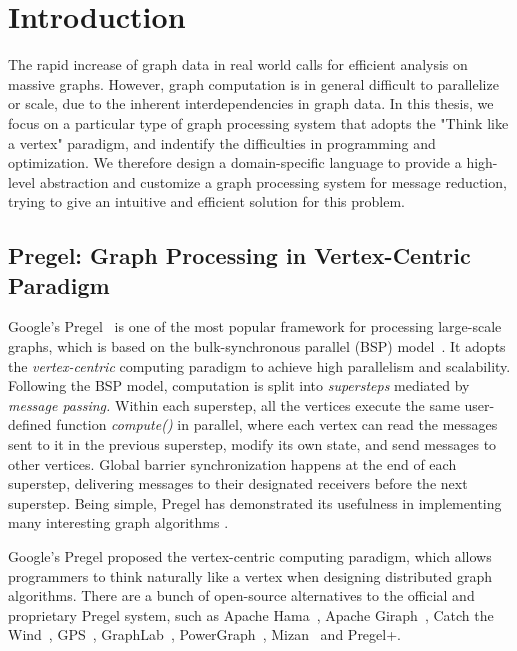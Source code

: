 \documentclass{sokendai_thesis} %
\begin{document}

\mainmatter

\chapter{Introduction}

The rapid increase of graph data in real world calls for efficient analysis on massive graphs.
However, graph computation is in general difficult to parallelize or scale, due to the inherent interdependencies in graph data.
In this thesis, we focus on a particular type of graph processing system that adopts the "Think like a vertex" paradigm, and indentify the difficulties in programming and optimization.
We therefore design a domain-specific language to provide a high-level abstraction and customize a graph processing system for message reduction, trying to give an intuitive and efficient solution for this problem.

\section{Pregel: Graph Processing in Vertex-Centric Paradigm}

Google's Pregel~\cite{pregel} is one of the most popular framework for processing large-scale graphs, which is based on the bulk-synchronous
parallel (BSP) model~\cite{bsp}.
It adopts the \emph{vertex-centric} computing paradigm to achieve high parallelism and scalability.
Following the BSP model, computation is split into \emph{supersteps} mediated by \emph{message passing.}
Within each superstep, all the vertices execute the same user-defined function \emph{compute()} in parallel, where each vertex can read the messages sent to it in the previous superstep, modify its own state, and send messages to other vertices.
Global barrier synchronization happens at the end of each superstep, delivering messages to their designated receivers before the next superstep.
Being simple, Pregel has demonstrated its usefulness in implementing many interesting graph algorithms \cite{pregel,QuWH12,connectivity,optimizing,XiYZ14}.

Google's Pregel \cite{pregel} proposed the vertex-centric computing paradigm, which allows programmers to think naturally like a vertex when designing distributed graph algorithms.
There are a bunch of open-source alternatives to the official and proprietary Pregel system, such as Apache Hama~\cite{hama}, Apache Giraph~\cite{giraph}, Catch the Wind~\cite{catchw}, GPS~\cite{gps}, GraphLab~\cite{graphlab}, PowerGraph~\cite{powergraph}, Mizan~\cite{mizan} and Pregel+\cite{pregelplus}.
\end{document}
